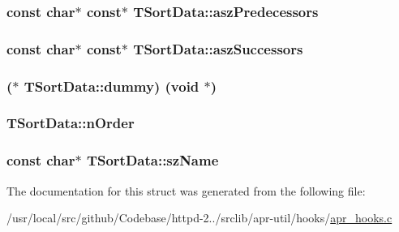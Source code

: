 \subsubsection[{\texorpdfstring{asz\+Predecessors}{aszPredecessors}}]{\setlength{\rightskip}{0pt plus 5cm}const char$\ast$ const$\ast$ T\+Sort\+Data\+::asz\+Predecessors}\hypertarget{structTSortData_ab4d190f818c1896cf3dc72640b2aa212}{}\label{structTSortData_ab4d190f818c1896cf3dc72640b2aa212}
\subsubsection[{\texorpdfstring{asz\+Successors}{aszSuccessors}}]{\setlength{\rightskip}{0pt plus 5cm}const char$\ast$ const$\ast$ T\+Sort\+Data\+::asz\+Successors}\hypertarget{structTSortData_aa387731427c4510472fe6820f1125d54}{}\label{structTSortData_aa387731427c4510472fe6820f1125d54}
\subsubsection[{\texorpdfstring{dummy}{dummy}}]{($\ast$ T\+Sort\+Data\+::dummy) ({\bf void} $\ast$)}\hypertarget{structTSortData_a9b8880246e3c4809ac5175e18a3439b9}{}\label{structTSortData_a9b8880246e3c4809ac5175e18a3439b9}
\subsubsection[{\texorpdfstring{n\+Order}{nOrder}}]{ T\+Sort\+Data\+::n\+Order}\hypertarget{structTSortData_a6d417262bfdd3af353d05dc9783a3ade}{}\label{structTSortData_a6d417262bfdd3af353d05dc9783a3ade}
\subsubsection[{\texorpdfstring{sz\+Name}{szName}}]{\setlength{\rightskip}{0pt plus 5cm}const char$\ast$ T\+Sort\+Data\+::sz\+Name}\hypertarget{structTSortData_a9e9aa97b772f82dcdcdc67db15caae4a}{}\label{structTSortData_a9e9aa97b772f82dcdcdc67db15caae4a}


The documentation for this struct was generated from the following file\+:\begin{DoxyCompactItemize}
\item 
/usr/local/src/github/\+Codebase/httpd-\/2../srclib/apr-\/util/hooks/\hyperlink{apr__hooks_8c}{apr\+\_\+hooks.\+c}\end{DoxyCompactItemize}
